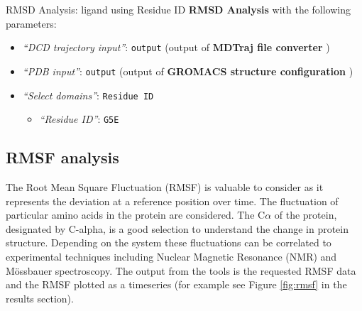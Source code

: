 \documentclass[twocolumn]{bmcart}%
\providecommand{\tightlist}{%
  \setlength{\itemsep}{0pt}\setlength{\parskip}{0pt}}
\begin{document}

\begin{handson_box_colour}{RMSD Analysis: ligand using Residue ID}
  \textbf{RMSD Analysis} with the following parameters:

  \begin{itemize}
  \tightlist
  \item
    \emph{``DCD trajectory input''}: \texttt{output} (output of
    \textbf{MDTraj file converter} )
  \item
    \emph{``PDB input''}: \texttt{output} (output of \textbf{GROMACS
    structure configuration} )
  \item
    \emph{``Select domains''}: \texttt{Residue\ ID}

    \begin{itemize}
    \tightlist
    \item
      \emph{``Residue ID''}: \texttt{G5E}
    \end{itemize}
  \end{itemize}



\end{handson_box_colour}



\hypertarget{rmsf-analysis}{%
\subsection*{RMSF analysis}\label{rmsf-analysis}}

The Root Mean Square Fluctuation (RMSF) is valuable to consider as it represents the deviation at a reference position over time. The fluctuation of particular amino acids in the protein are considered. The C$\alpha$ of the protein, designated by C-alpha, is a good selection to understand the change in protein structure. Depending on the system these fluctuations can be correlated to experimental techniques including Nuclear Magnetic Resonance (NMR) and M\"{o}ssbauer spectroscopy\cite{berjanskii_nmr_2006,kuzmanic_determination_2010}. The output from the tools is the requested RMSF data and the RMSF plotted as a timeseries (for example see Figure \ref{fig:rmsf} in the results section).
\end{document}
